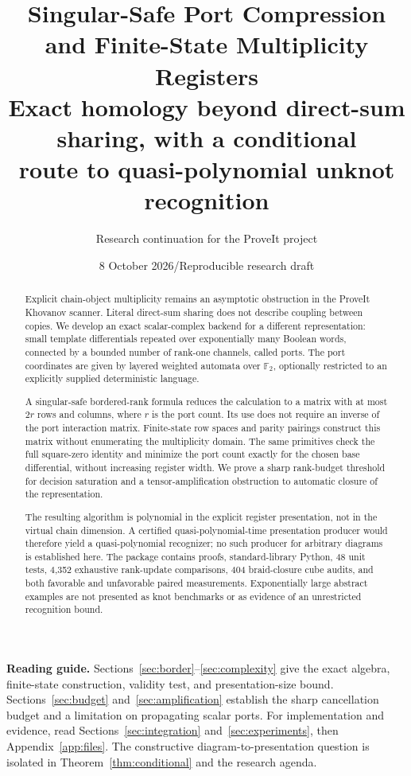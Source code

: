 \documentclass[11pt,letterpaper]{article}
\title{\LARGE Singular-Safe Port Compression\\ and Finite-State Multiplicity Registers\\[0.5em]
\large Exact homology beyond direct-sum sharing, with a conditional\\ route to quasi-polynomial unknot recognition}
\author{Research continuation for the ProveIt project}
\date{8 October 2026\quad /\quad Reproducible research draft}
\newcommand{\F}{{\mathbb F_2}}
\theoremstyle{definition}
\theoremstyle{remark}
\numberwithin{equation}{section}
\begin{document}
\maketitle
\begin{abstract}
Explicit chain-object multiplicity remains an asymptotic obstruction in the
ProveIt Khovanov scanner. Literal direct-sum sharing does not describe coupling
between copies. We develop an exact scalar-complex backend for a different
representation: small template differentials repeated over exponentially many
Boolean words, connected by a bounded number of rank-one channels, called
ports. The port coordinates are given by layered weighted automata over
$\F$, optionally restricted to an explicitly supplied deterministic language.

A singular-safe bordered-rank formula reduces the calculation to a matrix
with at most $2r$ rows and columns, where $r$ is the port count. Its use does
not require an inverse of the port interaction matrix. Finite-state row
spaces and parity pairings construct this matrix without enumerating the
multiplicity domain. The same primitives check the full square-zero identity
and minimize the port count exactly for the chosen base differential,
without increasing register width. We prove a sharp rank-budget threshold
for decision saturation and a tensor-amplification obstruction to automatic
closure of the representation.

The resulting algorithm is polynomial in the explicit register presentation,
not in the virtual chain dimension. A certified quasi-polynomial-time
presentation producer would therefore yield a quasi-polynomial recognizer;
no such producer for arbitrary diagrams is established here. The package
contains proofs, standard-library Python, 48 unit tests, 4,352 exhaustive
rank-update comparisons, 404 braid-closure cube audits, and both favorable
and unfavorable paired measurements. Exponentially large abstract examples
are not presented as knot benchmarks or as evidence of an unrestricted
recognition bound.
\end{abstract}
\clearpage
\tableofcontents
\bigskip
\noindent\textbf{Reading guide.}
Sections~\ref{sec:border}--\ref{sec:complexity} give the exact algebra,
finite-state construction, validity test, and presentation-size bound.
Sections~\ref{sec:budget} and~\ref{sec:amplification} establish the sharp
cancellation budget and a limitation on propagating scalar ports.
For implementation and evidence, read Sections~\ref{sec:integration}
and~\ref{sec:experiments}, then Appendix~\ref{app:files}.
The constructive diagram-to-presentation question is isolated in
Theorem~\ref{thm:conditional} and the research agenda.
\newpage
\end{document}
